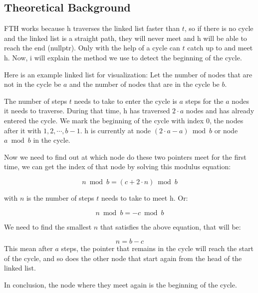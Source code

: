 \documentclass[12pt, letterpaper]{article}
\newcommand{\tortoise}{\textit{t}}
\newcommand{\hare}{\textit{h}}
\begin{document}
\subsection{Theoretical Background}
FTH works because \(\hare\) traverses the linked list faster than \(\tortoise\), so if there is no cycle and the linked list is a straight path, they will never meet and \(\hare\) will be able to reach the end (nullptr). Only with the help of a cycle can \(\tortoise\) catch up to and meet \(\hare\). Now, i will explain the method we use to detect the beginning of the cycle.

Here is an example linked list for visualization:
Let the number of nodes that are not in the cycle be \(a\) and the number of nodes that are in the cycle be \(b\). 

The number of steps \( \tortoise \) needs to take to enter the cycle is \( a \) steps for the \( a \) nodes it needs to traverse. During that time, \( \hare \) has traversed \( 2 \cdot a \) nodes and has already entered the cycle. We mark the beginning of the cycle with index 0, the nodes after it with \( 1, 2, \cdots, b - 1 \). \( \hare \) is currently at node \( (2 \cdot a - a) \bmod b \) or node \( a \bmod b \) in the cycle.


Now we need to find out at which node do these two pointers meet for the first time, we can get the index of that node by solving this modulus equation:

\begin{equation}
n \bmod b = (c + 2 \cdot n) \bmod b
\end{equation}

with \(n\) is the number of steps \(\tortoise\) needs to take to meet \(\hare\). Or: 

\begin{equation}
n \bmod b = -c \bmod b
\end{equation}

We need to find the smallest \(n\) that satisfies the above equation, that will be:

\begin{equation}
n  = b-c
\end{equation}
This mean after \(a\) steps, the pointer that remains in the cycle will reach the start of the cycle, and so does the other node that start again from the head of the linked list.

In conclusion, the node where they meet again is the beginning of the cycle.
\end{document}
